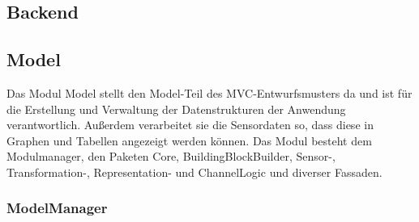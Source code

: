 \documentclass[parskip=full]{scrartcl}
\begin{document}
\subsection{Backend}


\clearpage
\subsection{Model}

Das Modul Model stellt den Model-Teil des MVC-Entwurfsmusters da und ist für die Erstellung und Verwaltung der Datenstrukturen der Anwendung verantwortlich. Außerdem verarbeitet sie die Sensordaten so, dass diese in Graphen und Tabellen angezeigt werden können. Das Modul besteht dem Modulmanager, den Paketen Core, BuildingBlockBuilder, Sensor-, Transformation-, Representation- und ChannelLogic und diverser Fassaden.

\subsubsection{ModelManager}
\end{document}
